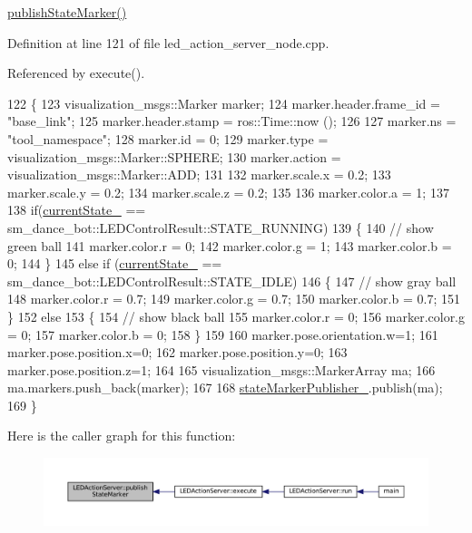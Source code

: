 \hyperlink{classLEDActionServer_a73bb754ac2347c50660624ad92315895}{publish\+State\+Marker()} 

Definition at line 121 of file led\+\_\+action\+\_\+server\+\_\+node.\+cpp.



Referenced by execute().


\begin{DoxyCode}
122 \{
123     visualization\_msgs::Marker marker;
124     marker.header.frame\_id = \textcolor{stringliteral}{"base\_link"};
125     marker.header.stamp = ros::Time::now ();
126 
127     marker.ns = \textcolor{stringliteral}{"tool\_namespace"};
128     marker.id = 0;
129     marker.type = visualization\_msgs::Marker::SPHERE;
130     marker.action = visualization\_msgs::Marker::ADD;
131     
132     marker.scale.x = 0.2;
133     marker.scale.y = 0.2;
134     marker.scale.z = 0.2;
135 
136     marker.color.a = 1;
137 
138     \textcolor{keywordflow}{if}(\hyperlink{classLEDActionServer_a1dc456e987dc331501ad6ff2215661ff}{currentState\_} == sm\_dance\_bot::LEDControlResult::STATE\_RUNNING)
139     \{
140       \textcolor{comment}{// show green ball}
141       marker.color.r = 0;
142       marker.color.g = 1;
143       marker.color.b = 0;
144     \}
145     \textcolor{keywordflow}{else} \textcolor{keywordflow}{if} (\hyperlink{classLEDActionServer_a1dc456e987dc331501ad6ff2215661ff}{currentState\_} == sm\_dance\_bot::LEDControlResult::STATE\_IDLE)
146     \{
147       \textcolor{comment}{// show gray ball}
148       marker.color.r = 0.7;
149       marker.color.g = 0.7;
150       marker.color.b = 0.7;
151     \}
152     \textcolor{keywordflow}{else}
153     \{
154       \textcolor{comment}{// show black ball}
155       marker.color.r = 0;
156       marker.color.g = 0;
157       marker.color.b = 0;
158     \}
159 
160     marker.pose.orientation.w=1;
161     marker.pose.position.x=0;
162     marker.pose.position.y=0;
163     marker.pose.position.z=1;
164 
165     visualization\_msgs::MarkerArray ma;
166     ma.markers.push\_back(marker);
167 
168     \hyperlink{classLEDActionServer_a4168a1e4a17eb1d65aaa059ce0c52086}{stateMarkerPublisher\_}.publish(ma);
169 \}
\end{DoxyCode}
Here is the caller graph for this function\+:
\nopagebreak
\begin{figure}[H]
\begin{center}
\leavevmode
\includegraphics[width=350pt]{classLEDActionServer_a73bb754ac2347c50660624ad92315895_icgraph}
\end{center}
\end{figure}
\mbox{\label{classLEDActionServer_a73bb754ac2347c50660624ad92315895}} 
